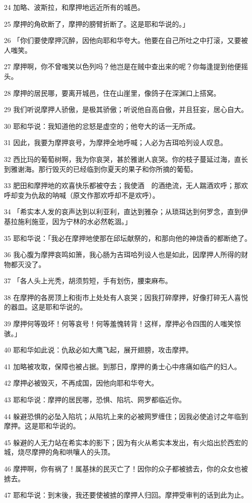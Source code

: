 \par 24 加略、波斯拉，和摩押地远近所有的城邑。
\par 25 摩押的角砍断了，摩押的膀臂折断了。这是耶和华说的。」
\par 26 「你们要使摩押沉醉，因他向耶和华夸大。他要在自己所吐之中打滚，又要被人嗤笑。
\par 27 摩押啊，你不曾嗤笑以色列吗？他岂是在贼中查出来的呢？你每逢提到他便摇头。
\par 28 摩押的居民哪，要离开城邑，住在山崖里，像鸽子在深渊口上搭窝。
\par 29 我们听说摩押人骄傲，是极其骄傲；听说他自高自傲，并且狂妄，居心自大。
\par 30 耶和华说：我知道他的忿怒是虚空的；他夸大的话一无所成。
\par 31 因此，我要为摩押哀号，为摩押全地呼喊；人必为吉珥哈列设人叹息。
\par 32 西比玛的葡萄树啊，我为你哀哭，甚於雅谢人哀哭。你的枝子蔓延过海，直长到雅谢海。那行毁灭的已经临到你夏天的果子和你所摘的葡萄。
\par 33 肥田和摩押地的欢喜快乐都被夺去；我使酒　的酒绝流，无人踹酒欢呼；那欢呼却变为仇敌的呐喊（原文作那欢呼却不是欢呼）。
\par 34 「希实本人发的哀声达到以利亚利，直达到雅杂；从琐珥达到何罗念，直到伊基拉施利施亚，因为宁林的水必然乾涸。」
\par 35 耶和华说：「我必在摩押地使那在邱坛献祭的，和那向他的神烧香的都断绝了。
\par 36 我心腹为摩押哀鸣如箫，我心肠为吉珥哈列设人也是如此，因摩押人所得的财物都灭没了。
\par 37 「各人头上光秃，胡须剪短，手有划伤，腰束麻布。
\par 38 在摩押的各房顶上和街市上处处有人哀哭；因我打碎摩押，好像打碎无人喜悦的器皿。这是耶和华说的。
\par 39 摩押何等毁坏！何等哀号！何等羞愧转背！这样，摩押必令四围的人嗤笑惊骇。」
\par 40 耶和华如此说：仇敌必如大鹰飞起，展开翅膀，攻击摩押。
\par 41 加略被攻取，保障也被占据。到那日，摩押的勇士心中疼痛如临产的妇人。
\par 42 摩押必被毁灭，不再成国，因他向耶和华夸大。
\par 43 耶和华说：摩押的居民哪，恐惧、陷坑、网罗都临近你。
\par 44 躲避恐惧的必坠入陷坑；从陷坑上来的必被网罗缠住；因我必使追讨之年临到摩押。这是耶和华说的。
\par 45 躲避的人无力站在希实本的影下；因为有火从希实本发出，有火焰出於西宏的城，烧尽摩押的角和哄嚷人的头顶。
\par 46 摩押啊，你有祸了！属基抹的民灭亡了！因你的众子都被掳去，你的众女也被掳去。
\par 47 耶和华说：到末後，我还要使被掳的摩押人归回。摩押受审判的话到此为止。

